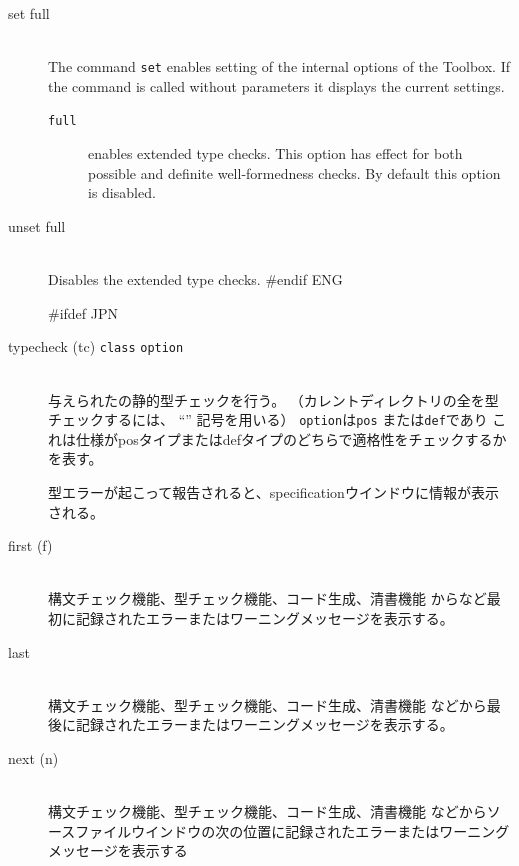 \documentclass[\pformat,12pt]{article}
\newcommand{\Toolbox}{Toolbox}
\newcommand{\Toolbox}{Toolbox}
\begin{document}
\begin{description}
\item[set full]\mbox{}\\
  The command {\tt set} enables setting of the internal options of the
  \Toolbox.  If the command is called without parameters it displays
  the current settings.
  \begin{description}
    \item[{\tt full}] enables extended type checks. This option has
      effect for both possible and definite well-formedness checks. By
      default this option is disabled.
  \end{description}
\item[unset full]\mbox{}\\
  Disables the extended type checks.
#endif ENG

#ifdef JPN
\item[typecheck (tc) 
{{\tt class}} {\tt option}]\mbox{}\\ 
  与えられたの静的型チェックを行う。
  （カレントディレクトリの全を型チェックするには、
  ``{\tt *}'' 記号を用いる）
  {\tt option}は{\tt pos} または{\tt def}であり
  これは仕様がposタイプまたはdefタイプのどちらで適格性をチェックするかを表す。

  型エラーが起こって報告されると、specificationウインドウに情報が表示される。

\item[first (f)] \mbox{}\\
  構文チェック機能、型チェック機能、コード生成、清書機能
  からなど最初に記録されたエラーまたはワーニングメッセージを表示する。

\item[last] \mbox{}\\
  構文チェック機能、型チェック機能、コード生成、清書機能
  などから最後に記録されたエラーまたはワーニングメッセージを表示する。

\item[next (n) ]\mbox{}\\
  構文チェック機能、型チェック機能、コード生成、清書機能
  などからソースファイルウインドウの次の位置に記録されたエラーまたはワーニングメッセージを表示する


\end{description}
\end{document}
